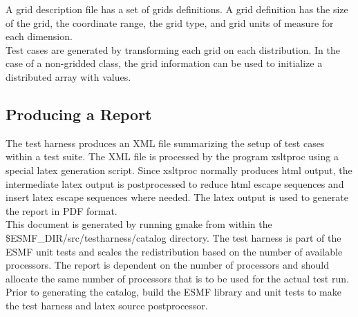 \documentclass[english]{article}
\begin{document}
A grid description file has a set of grids definitions.
A grid definition has the size of the grid, the coordinate range, the grid type, and grid 
units of measure for each dimension. \\

Test cases are generated by transforming each grid on each distribution. In the case of a non-gridded class,
the grid information can be used to initialize a distributed array with values. \\

\subsection{Producing a Report}
The test harness produces an XML file summarizing the setup of test cases within a test suite.
The XML file is processed by the program xsltproc using a special latex generation script.  
Since xsltproc normally produces html output, the intermediate latex output is postprocessed to reduce
html escape sequences and insert latex escape sequences where needed.  
The latex output is used to generate the report in PDF format. \\

This document is generated by running gmake from within the \$ESMF\_DIR/src/testharness/catalog
directory.  The test harness is part of the ESMF unit tests and scales the redistribution based
on the number of available processors. The report is dependent on the number of processors
and should allocate the same number of processors that is to be used for the actual test run. \\

Prior to generating the catalog, build the ESMF library and unit tests to make the test harness and
latex source postprocessor. \\






\end{document}
